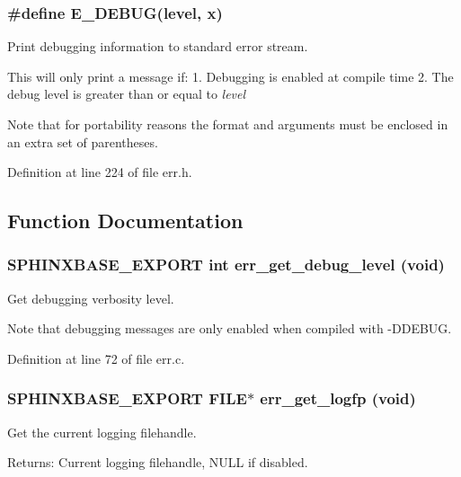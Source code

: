 \subsubsection[{E\_\-DEBUG}]{\setlength{\rightskip}{0pt plus 5cm}\#define E\_\-DEBUG(level, \/  x)}\label{err_8h_f46f94d0e21f22f1153f8f1cd9a372d6}


Print debugging information to standard error stream. 

This will only print a message if: 1. Debugging is enabled at compile time 2. The debug level is greater than or equal to {\em level\/} 

Note that for portability reasons the format and arguments must be enclosed in an extra set of parentheses. 

Definition at line 224 of file err.h.

\subsection{Function Documentation}
\subsubsection[{err\_\-get\_\-debug\_\-level}]{\setlength{\rightskip}{0pt plus 5cm}SPHINXBASE\_\-EXPORT int err\_\-get\_\-debug\_\-level (void)}\label{err_8h_1500dc011016aa15244d0d7f2fe66a7e}


Get debugging verbosity level. 

Note that debugging messages are only enabled when compiled with -DDEBUG. 

Definition at line 72 of file err.c.
\subsubsection[{err\_\-get\_\-logfp}]{\setlength{\rightskip}{0pt plus 5cm}SPHINXBASE\_\-EXPORT FILE$\ast$ err\_\-get\_\-logfp (void)}\label{err_8h_9707012f263e46ea66e93349313ddbe6}


Get the current logging filehandle. 

\begin{Desc}
\item[Returns:]Current logging filehandle, NULL if disabled. \end{Desc}


